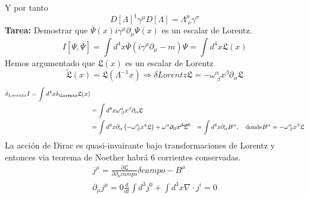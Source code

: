 \documentclass[../main.tex]{subfiles}
\begin{document}
Y por tanto
\begin{equation}
  \boxed{ D[\Lambda]^{1} \gamma^\mu D[\Lambda] = \Lambda^\mu_{\; \nu} \gamma^\sigma }
 \end{equation}
 \textbf{Tarea:} Demostrar que $\bar{\Psi}(x)i\gamma^\mu \partial_\mu \Psi(x)$ es un escalar de Lorentz.
 \begin{equation}
   I[\Psi,\bar{\Psi}] = \int d^4x \bar{\Psi} \left( i\gamma^\mu \partial_\mu - m  \right)\Psi = \int d^4x \mathfrak{L}(x)
  \end{equation}
  Hemos argumentado que $\mathfrak{L}(x)$ es un escalar de Lorentz 
  \begin{equation*}
    \tilde{\mathfrak{L}}(x) = \mathfrak{L}(\Lambda^{-1}x) \Rightarrow \delta{Lorentz} \mathfrak{L} = -\omega^\alpha_{\;\beta} x^\beta \partial_\alpha \mathfrak{L}
  \end{equation*}
  \begin{align*}
    \delta_{Lorentz} I  = \int d^4 x \delta_{\Lorentz} \mathfrak{L}(x) \\
    & = \int d^4 x \omega^\alpha_{\; \beta} x^\beta \partial_\alpha \mathfrak{L} \\
    & = \int d^4x \partial_\alpha \left( -\omega^\alpha_{\; \beta} x^\eta \mathfrak{L} \right) + \omega^\alpha \cancel{\partial_\alpha x^\beta \mathfrak{L}}^0 
    & = \int d^4 x \partial_\alpha B^\alpha , \quad \text{donde} B^\alpha = -\omega^\alpha_{\; \beta}x^\beta \mathfrak{L}
  \end{align*}
  La acción de Dirac es quasi-invairante bajo transformaciones de Lorentz y entonces via teorema de Noether habrá 6 corrientes conservadas.
  \begin{align*}
    j^\mu  = \frac{\partial \mathfrak{L}}{\partial \partial_\mu campo} \delta campo - B^\mu \\
    \partial_\mu j^\mu = 0
 \frac{d}{dt}\int d^3 j^0 + \int d^3x \nabla \cdot j^i = 0 
  \end{align*}
\end{document}
